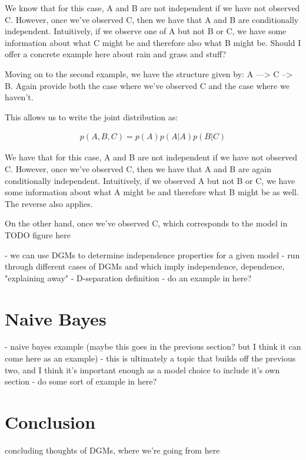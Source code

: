 We know that for this case, A and B are not independent if we have not observed C. However, once we've observed C, then we have that A and B are conditionally independent. Intuitively, if we observe one of A but not B or C, we have some information about what C might be and therefore also what B might be. Should I offer a concrete example here about rain and grass and stuff?

Moving on to the second example, we have the structure given by: A ---> C --> B. Again provide both the case where we've observed C and the case where we haven't.

This allows us to write the joint distribution as:

\begin{align*}
	p(A, B, C) = p(A) p(A | A) p(B | C)
\end{align*}

We have that for this case, A and B are not independent if we have not observed C. However, once we've observed C, then we have that A and B are again conditionally independent. Intuitively, if we observed A but not B or C, we have some information about what A might be and therefore what B might be as well. The reverse also applies.

On the other hand, once we've observed C, which corresponds to the model in TODO figure here

- we can use DGMs to determine independence properties for a given model
- run through different cases of DGMs and which imply independence, dependence, "explaining away"
- D-separation definition
- do an example in here?

\section{Naive Bayes}
- naive bayes example (maybe this goes in the previous section? but I think it can come here as an example)
- this is ultimately a topic that builds off the previous two, and I think it's important enough as a model choice to include it's own section
- do some sort of example in here?

\section{Conclusion}
concluding thoughts of DGMs, where we're going from here


